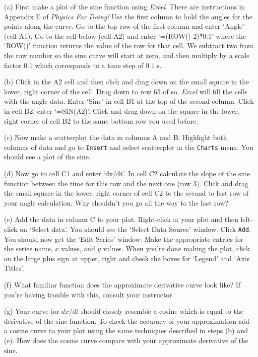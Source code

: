 (a) First make a plot of the sine function using {\it Excel}. 
There are instructions in Appendix E of {\it Physics For Doing!}
Use the first column to hold the angles for the points along the curve.
Go to the top row of the first column and
enter `Angle' (cell A1).
Go to the cell below (cell A2) and enter `=(ROW()-2)*0.1' where the
`ROW()' function returns the value of the row for that cell. We subtract two from
the row number so the sine curve will start at zero, and then multiply by a
scale factor 0.1 which corresponds to a time step of $0.1~s$.

(b) Click in the A2 cell and then click and drag down on the small square in the lower, right corner
of the cell. Drag down to row 65 of so.
{\it Excel} will fill the cells with the angle data.
Enter `Sine' in cell B1 at the top of the second column.
Click in cell B2, enter `=SIN(A2)'.
Click and drag down on the square in the lower, right corner of cell B2 to the same bottom row 
you used before.

(c) Now make a scatterplot the data in columns A and B. Highlight both columns of data and 
go to {\tt Insert} and select scatterplot in the {\tt Charts} menu. You should see 
a plot of the sine.

\pagebreak 

(d) Now go to cell C1 and enter `dx/dt'. In cell C2 calculate the slope of the sine
function between the time for this row and the next one (row 3).
Click and drag the small square in the lower, right corner of
cell C2 to the second to last row of your angle calculation.
Why shouldn't you go all the way to the last row?

\vspace{1.8cm}

(e) Add the data in column C to your plot. Right-click in your plot and then left-click
on `Select data'. You should see the `Select Data Source' window. Click {\tt Add}.
You should now get the `Edit Series' window. Make the appropriate entries
for the series name, $x$ values, and $y$ values.
When you're done making the plot, click on the large plus sign at upper, right and check
the boxes for `Legend' and `Axis Titles'.

(f) What familiar function does the approximate derivative curve look like?
If you're having trouble with this, consult your instructor.

\vspace{1.8cm}

(g) Your curve for $dx/dt$ should closely resemble a cosine which is equal
to the derivative of the sine function.
To check the accuracy of your approximation add a cosine curve to your plot
using the same techniques described in steps (b) and (e). 
How does the cosine curve compare with your approximate derivative of the sine.

